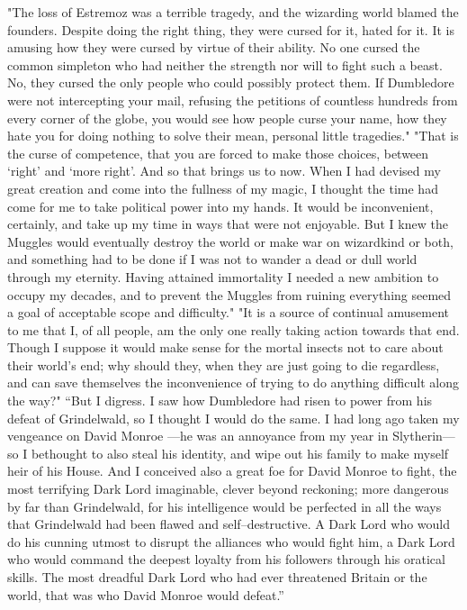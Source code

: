"The loss of Estremoz was a terrible tragedy, and the wizarding world blamed the founders. Despite doing the right thing, they were cursed for it, hated for it. It is amusing how they were cursed by virtue of their ability. No one cursed the common simpleton who had neither the strength nor will to fight such a beast. No, they cursed the only people who could possibly protect them. If Dumbledore were not intercepting your mail, refusing the petitions of countless hundreds from every corner of the globe, you would see how people curse your name, how they hate you for doing nothing to solve their mean, personal little tragedies."
\SmallVSpace
"That is the curse of competence, that you are forced to make those choices, between ‘right’ and ‘more right’. And so that brings us to now. When I had devised my great creation and come into the fullness of my magic, I thought the time had come for me to take political power into my hands. It would be inconvenient, certainly, and take up my time in ways that were not enjoyable. But I knew the Muggles would eventually destroy the world or make war on wizardkind or both, and something had to be done if I was not to wander a dead or dull world through my eternity. Having attained immortality I needed a new ambition to occupy my decades, and to prevent the Muggles from ruining everything seemed a goal of acceptable scope and difficulty."
\SmallVSpace
"It is a source of continual amusement to me that I, of all people, am the only one really taking action towards that end. Though I suppose it would make sense for the mortal insects not to care about their world’s end; why should they, when they are just going to die regardless, and can save themselves the inconvenience of trying to do anything difficult along the way?"
\SmallVSpace
“But I digress. I saw how Dumbledore had risen to power from his defeat of Grindelwald, so I thought I would do the same. I had long ago taken my vengeance on David Monroe \mbox{---}he was an annoyance from my year in Slytherin\mbox{---} so I bethought to also steal his identity, and wipe out his family to make myself heir of his House. And I conceived also a great foe for David Monroe to fight, the most terrifying Dark Lord imaginable, clever beyond reckoning; more dangerous by far than Grindelwald, for his intelligence would be perfected in all the ways that Grindelwald had been flawed and self\mbox{--}destructive. A Dark Lord who would do his cunning utmost to disrupt the alliances who would fight him, a Dark Lord who would command the deepest loyalty from his followers through his oratical skills. The most dreadful Dark Lord who had ever threatened Britain or the world, that was who David Monroe would defeat.”

